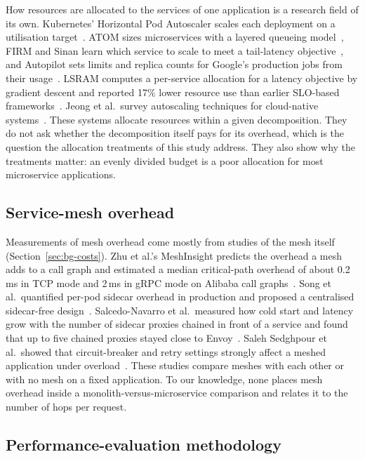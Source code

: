 How resources are allocated to the services of one application is a research field of its own. Kubernetes'
Horizontal Pod Autoscaler scales each deployment on a utilisation target~\cite{Nguyen2020}. ATOM sizes
microservices with a layered queueing model~\cite{Gias2019}, FIRM and Sinan learn which service to scale to meet a
tail-latency objective~\cite{Qiu2020,Zhang2021Sinan}, and Autopilot sets limits and replica counts for Google's
production jobs from their usage~\cite{Rzadca2020}. LSRAM computes a per-service allocation for a latency objective by gradient
descent and reported 17\% lower resource use than earlier SLO-based frameworks~\cite{Hu2025LSRAM}. Jeong et al.\ survey autoscaling techniques for cloud-native
systems~\cite{Jeong2025}. These systems allocate resources within a given decomposition. They do not ask whether
the decomposition itself pays for its overhead, which is the question the allocation treatments of this study
address. They also show why the treatments matter: an evenly divided budget is a poor allocation for most
microservice applications.

\subsection{Service-mesh overhead}
\label{sec:rw-mesh}

Measurements of mesh overhead come mostly from studies of the mesh itself (Section~\ref{sec:bg-costs}). Zhu et
al.'s MeshInsight predicts the overhead a mesh adds to a call graph and estimated a median critical-path overhead
of about 0.2\,ms in TCP mode and 2\,ms in gRPC mode on Alibaba call graphs~\cite{Zhu2023}. Song et al.\ quantified
per-pod sidecar overhead in production and proposed a centralised sidecar-free design~\cite{Song2024}. Salcedo-Navarro et al.\ measured how cold start and
latency grow with the number of sidecar proxies chained in front of a service and found that up to five chained
proxies stayed close to Envoy~\cite{SalcedoNavarro2025}. Saleh
Sedghpour et al.\ showed that circuit-breaker and retry settings strongly affect a meshed application under
overload~\cite{SalehSedghpour2022}. These studies
compare meshes with each other or with no mesh on a fixed application. To our knowledge, none
places mesh overhead inside a monolith-versus-microservice comparison and relates it to the number
of hops per request.

\subsection{Performance-evaluation methodology}
\label{sec:rw-method}

